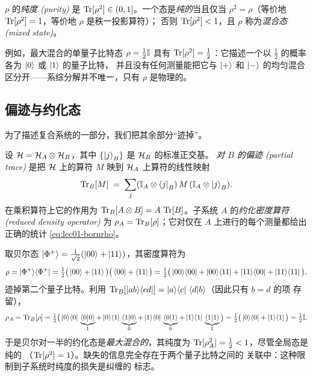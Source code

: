 \begin{definition}[纯度；纯态与混合态]\label{def:lec01-purity}
$\rho$ 的\emph{纯度 (purity)} 是 $\operatorname{Tr}[\rho^{2}]\in(0,1]$。一个态是\emph{纯的}当且仅当
$\rho^{2}=\rho$（等价地 $\operatorname{Tr}[\rho^{2}]=1$，等价地 $\rho$ 是秩一投影算符）；
否则 $\operatorname{Tr}[\rho^{2}]<1$，且 $\rho$ 称为\emph{混合态 (mixed state)}。
\end{definition}

例如，最大混合的单量子比特态 $\rho=\tfrac12\mathbb{I}$ 具有
$\operatorname{Tr}[\rho^{2}]=\tfrac12$：它描述一个以 $\tfrac12$ 的概率各为 $\ket{0}$ 或 $\ket{1}$ 的量子比特，
并且没有任何测量能把它与 $\ket{+}$ 和 $\ket{-}$ 的均匀混合区分开——系综分解并不唯一，只有
$\rho$ 是物理的。

\subsection{偏迹与约化态}

为了描述复合系统的一部分，我们把其余部分“迹掉”。

\begin{definition}[偏迹]\label{def:lec01-ptrace}
设 $\mathcal{H}=\mathcal{H}_A\otimes\mathcal{H}_B$，其中 $\{\ket{j}_B\}$ 是 $\mathcal{H}_B$ 的标准正交基。
\emph{对 $B$ 的偏迹 (partial trace)} 是把 $\mathcal{H}$ 上的算符
$M$ 映到 $\mathcal{H}_A$ 上算符的线性映射
\begin{equation}
  \operatorname{Tr}_B[M]\;=\;\sum_j (\mathbb{I}_A\otimes\bra{j}_B)\,M\,(\mathbb{I}_A\otimes\ket{j}_B).
\end{equation}
在乘积算符上它的作用为 $\operatorname{Tr}_B[A\otimes B]=A\,\operatorname{Tr}[B]$。子系统 $A$ 的\emph{约化密度算符 (reduced
density operator)} 为 $\rho_A=\operatorname{Tr}_B[\rho]$；它对仅在 $A$ 上进行的每个测量都给出正确的统计
\eqref{eq:lec01-bornrho}。
\end{definition}

\begin{example}[贝尔对的约化态]\label{ex:lec01-bellreduced}
取贝尔态 $\ket{\Phi^{+}}=\tfrac{1}{\sqrt2}(\ket{00}+\ket{11})$，其密度算符为
\[
  \rho=\ket{\Phi^{+}}\!\bra{\Phi^{+}}
   =\tfrac12\big(\ket{00}+\ket{11}\big)\big(\bra{00}+\bra{11}\big)
   =\tfrac12\big(\ket{00}\!\bra{00}+\ket{00}\!\bra{11}+\ket{11}\!\bra{00}+\ket{11}\!\bra{11}\big).
\]
迹掉第二个量子比特。利用
$\operatorname{Tr}_B[\ket{ab}\!\bra{cd}]=\ket{a}\!\bra{c}\,\braket{d|b}$（因此只有 $b=d$ 的项
存留），
\[
  \rho_A=\operatorname{Tr}_B[\rho]
   =\tfrac12\big(\ket{0}\!\bra{0}\,\underbrace{\braket{0|0}}_{1}+\ket{0}\!\bra{1}\,\underbrace{\braket{1|0}}_{0}
   +\ket{1}\!\bra{0}\,\underbrace{\braket{0|1}}_{0}+\ket{1}\!\bra{1}\,\underbrace{\braket{1|1}}_{1}\big)
   =\tfrac12\big(\ket{0}\!\bra{0}+\ket{1}\!\bra{1}\big)=\tfrac12\mathbb{I}.
\]
于是贝尔对一半的约化态是\emph{最大混合的}，其纯度为
$\operatorname{Tr}[\rho_A^{2}]=\tfrac12<1$，尽管全局态是纯的
（$\operatorname{Tr}[\rho^{2}]=1$）。缺失的信息完全存在于两个量子比特之间的
关联中：这种限制到子系统时纯度的损失是纠缠的
标志。
\end{example}

